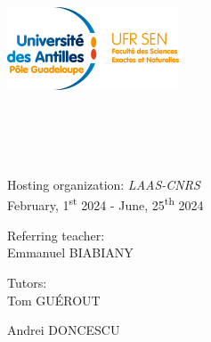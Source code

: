 \begin{titlepage}
	\begin{center}
		\includegraphics[scale=1.80]{../images/logo_ufr_sen.png} \\[2cm]
		\hspace{2cm}

		\HRule \\[0.4cm]
		\@title \\[0.4cm]
		\HRule \\[1cm]

		\@author \\ [1.5cm]

		{\large Hosting organization: \textsl{LAAS-CNRS}} \\[1.5cm]

		{\large February, 1\textsuperscript{st} 2024 - June, 25\textsuperscript{th} 2024} \\[1.5cm]

		\begin{minipage}{0.7\textwidth}
			\begin{flushleft}
				Referring teacher:\\
				\hspace{0.2cm}  Emmanuel \textsc{BIABIANY}
			\end{flushleft}
		\end{minipage}

		\vspace{-0.85cm}
		\hspace{9cm}
		\begin{minipage}{0.3\textwidth}
			\begin{flushleft}
				Tutors:\\
				\hspace{0.2cm} Tom \textsc{GUÉROUT}

				\hspace{0.2cm}  Andrei \textsc{DONCESCU}
			\end{flushleft}
		\end{minipage}\\[3cm]

		\@date
	\end{center}
\end{titlepage}
